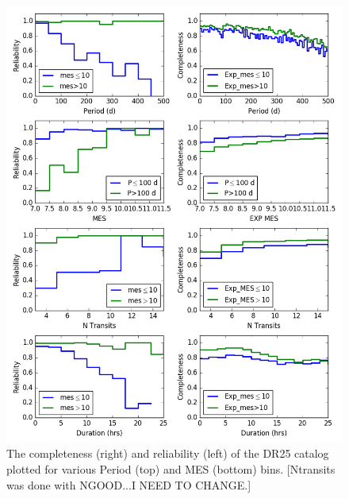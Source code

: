 \begin{figure}[h!]
 \begin{center}
  \includegraphics[width=1.0\linewidth]{fig-compRel1D-PerMes.png}
  \caption{ The completeness (right) and reliability (left) of the DR25 catalog plotted for various Period (top) and MES (bottom) bins. [Ntransits was done with NGOOD...I NEED TO CHANGE.] }
  \label{f:1dcompare}
 \end{center}
 \end{figure}

